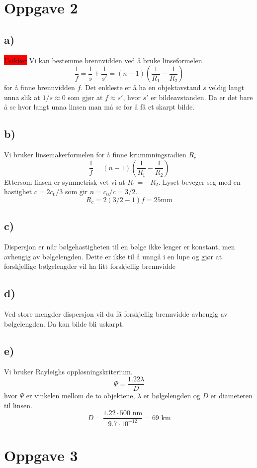 \documentclass{article}
\begin{document}
\section*{Oppgave 2}
\subsection*{a)}
\colorbox{red}{Usikker}
Vi kan bestemme brennvidden ved å bruke linseformelen. 
\[
\frac{1}{f} = \frac{1}{s} + \frac{1}{s'} = (n-1) \left( \frac{1}{R_1} - \frac{1}{R_2} \right)
\]
for å finne brennvidden $f$. Det enkleste er å ha en objektavstand $s$ veldig langt unna slik at $1 / s ≈ 0$ som gjør at $f ≈ s'$, hvor $s'$ er bildeavstanden. Da er det bare å se hvor langt unna linsen man må se for å få et skarpt bilde. 

\subsection*{b)}
Vi bruker linsemakerformelen for å finne krummningsradien $R_c$
\[
\frac{1}{f} = (n-1) \left( \frac{1}{R_1} - \frac{1}{R_2} \right)
\]
Ettersom linsen er symmetrisk vet vi at $R_1 = - R_2$. Lyset beveger seg med en hastighet $c = 2c_0 / 3$ som gir $n = c_0 / c = 3 / 2$. 
\[
R_c = 2(3 / 2 - 1)f = 25 \text{mm}
\]

\subsection*{c)}
Dispersjon er når bølgehastigheten til en bølge ikke lenger er konstant, men avhengig av bølgelengden. Dette er ikke til å unngå i en lupe og gjør at forskjellige bølgelengder vil ha litt forskjellig brennvidde

\subsection*{d)}
Ved store mengder dispersjon vil du få forskjellig brennvidde avhengig av bølgelengden. Da kan bilde bli uskarpt. 

\subsection*{e)}
Vi bruker Rayleighs oppløsningskriterium. 
\[
Ψ = \frac{1.22 λ}{D}
\]
hvor $Ψ$ er vinkelen mellom de to objektene, $λ$ er bølgelengden og $D$ er diameteren til linsen.
\[
D = \frac{1.22 ⋅ 500 \text{ nm}}{9.7 ⋅ 10^{-12}} = 69 \text{ km}  
\]

 
\section*{Oppgave 3}
\end{document}
